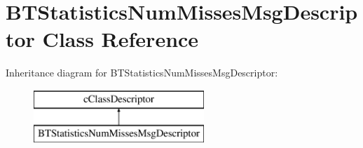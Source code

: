 \hypertarget{classBTStatisticsNumMissesMsgDescriptor}{}\section{B\+T\+Statistics\+Num\+Misses\+Msg\+Descriptor Class Reference}
\label{classBTStatisticsNumMissesMsgDescriptor}
Inheritance diagram for B\+T\+Statistics\+Num\+Misses\+Msg\+Descriptor\+:\begin{figure}[H]
\begin{center}
\leavevmode
\includegraphics[height=2.000000cm]{classBTStatisticsNumMissesMsgDescriptor}
\end{center}
\end{figure}
